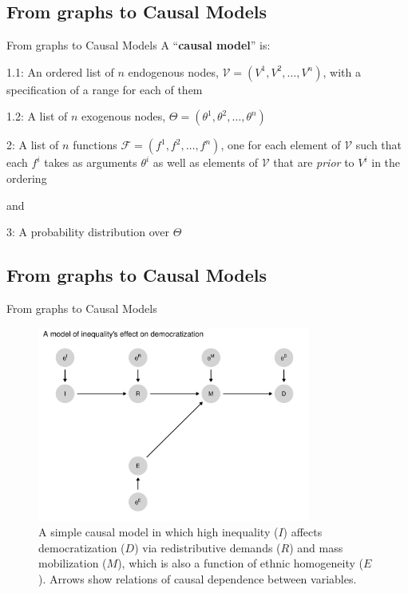 \documentclass[
  11pt,
  ignorenonframetext,
]{beamer}
\begin{document}
\hypertarget{from-graphs-to-causal-models}{%
\subsection{From graphs to Causal
Models}\label{from-graphs-to-causal-models}}

\begin{frame}{From graphs to Causal Models}
A ``\textbf{causal model}'' is:

1.1: An ordered list of \(n\) endogenous nodes,
\(\mathcal{V}= (V^1, V^2,\dots, V^n)\), with a specification of a range
for each of them

1.2: A list of \(n\) exogenous nodes,
\(\Theta = (\theta^1, \theta^2,\dots , \theta^n)\)

2: A list of \(n\) functions \(\mathcal{F}= (f^1, f^2,\dots, f^n)\), one
for each element of \(\mathcal{V}\) such that each \(f^i\) takes as
arguments \(\theta^i\) as well as elements of \(\mathcal{V}\) that are
\emph{prior} to \(V^i\) in the ordering

and

3: A probability distribution over \(\Theta\)
\end{frame}

\hypertarget{from-graphs-to-causal-models-1}{%
\subsection{From graphs to Causal
Models}\label{from-graphs-to-causal-models-1}}

\begin{frame}{From graphs to Causal Models}
\begin{figure}

{\centering \includegraphics[width=0.8\textwidth,height=\textheight]{0_lectures_files/figure-beamer/HJ-F-2-1-1.pdf}

}

\caption{A simple causal model in which high inequality (\(I\)) affects
democratization (\(D\)) via redistributive demands (\(R\)) and mass
mobilization (\(M\)), which is also a function of ethnic homogeneity
(\(E\)). Arrows show relations of causal dependence between variables.}

\end{figure}
\end{frame}
\end{document}
